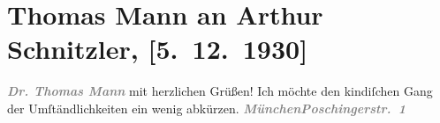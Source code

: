 

         
         \renewcommand{\erwaehntePersonen}{Personen: Thomas Mann}
         \renewcommand{\erwaehnteOrte}{Orte: München, Poschingerstraße, Wien}
         \renewcommand{\erwaehnteWerke}{}
               \section[Thomas Mann an Arthur Schnitzler, {[}5. 12. 1930{]}]{ Thomas Mann an Arthur Schnitzler, {[}5. 12. 1930{]}}\nopagebreak{}\rehead{ }\begin{ledgroupsized}[t]{13cm}\normalsize\beginnumbering \toendnotes[C]{\smallbreak\pagebreak[2]} 
\pstart
           \noindent{}\centering{}{\pb}\textcolor{gray}{\textbf{\emph{Dr. Thomas Mann}}}\pend
           \pstart
           \noindent{}mit herzlichen Grüßen! Ich möchte den kindiſchen Gang der Umſtändlichkeiten ein wenig
               abkürzen.\pend
           \pstart
           \textcolor{gray}{\textbf{\emph{München}}}\hfill \textcolor{gray}{\textbf{\emph{Poschingerstr. 1}}}\pend
           
         
         \endnumbering{}\end{ledgroupsized}  \newcommand{\dateiname}{L02540}\newcommand{\titel}{Thomas Mann an Arthur Schnitzler, [5. 12. 1930]}\newcommand{\editorInnen}{Martin Anton Müller und Gerd-Hermann Susen}
      
